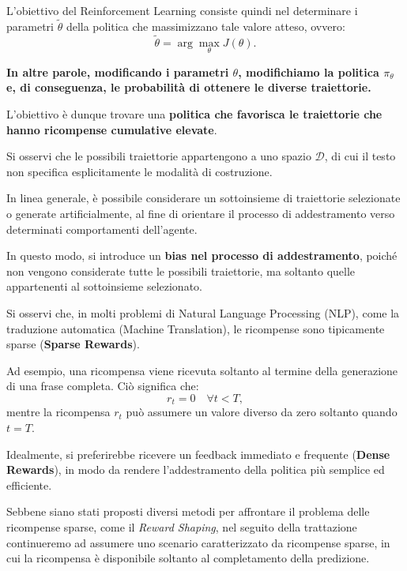 L'obiettivo del Reinforcement Learning consiste quindi nel 
determinare i parametri $\tilde{\theta}$ della politica 
che massimizzano tale valore atteso, ovvero:
\[
    \tilde{\theta} = \arg\max_{\theta} J(\theta).
\]

\textbf{In altre parole, modificando i parametri $\theta$, modifichiamo
la politica $\pi_\theta$ e, di conseguenza, le probabilità
di ottenere le diverse traiettorie.}

L'obiettivo è dunque trovare una \textbf{politica che favorisca
le traiettorie che hanno ricompense cumulative elevate}.

\begin{observation}{}
    Si osservi che le possibili traiettorie appartengono
    a uno spazio $\mathcal{D}$, di cui il testo non specifica
    esplicitamente le modalità di costruzione.

    In linea generale, è possibile considerare un sottoinsieme
    di traiettorie selezionate o generate artificialmente,
    al fine di orientare il processo di addestramento verso
    determinati comportamenti dell'agente.

    In questo modo, si introduce un \textbf{bias nel processo
    di addestramento}, poiché non vengono considerate tutte
    le possibili traiettorie, ma soltanto quelle appartenenti
    al sottoinsieme selezionato.
\end{observation}

Si osservi che, in molti problemi di Natural Language Processing
(NLP), come la traduzione automatica (Machine Translation),
le ricompense sono tipicamente sparse (\textbf{Sparse Rewards}).

Ad esempio, una ricompensa viene ricevuta soltanto al termine
della generazione di una frase completa. Ciò significa che:
\[
    r_t=0 \quad \forall t<T,
\]
mentre la ricompensa $r_t$ può assumere un valore diverso
da zero soltanto quando $t=T$.

Idealmente, si preferirebbe ricevere un feedback immediato
e frequente (\textbf{Dense Rewards}), in modo da rendere
l'addestramento della politica più semplice ed efficiente.

Sebbene siano stati proposti diversi metodi per affrontare
il problema delle ricompense sparse, come il
\textit{Reward Shaping}, nel seguito della trattazione
continueremo ad assumere uno scenario caratterizzato da
ricompense sparse, in cui la ricompensa è disponibile
soltanto al completamento della predizione.

